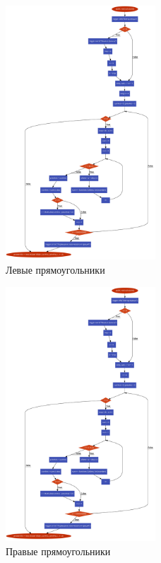 \documentclass{article}
\begin{document}
\begin{figure}[H]
    \centering
    \includegraphics[width=0.5\textwidth]{left.pdf}
    \caption{Левые прямоугольники}
    \label{fig:logs}
\end{figure}

\begin{figure}[H]
    \centering
    \includegraphics[width=0.5\textwidth]{right.pdf}
    \caption{Правые прямоугольники}
    \label{fig:logs}
\end{figure}
\end{document}
